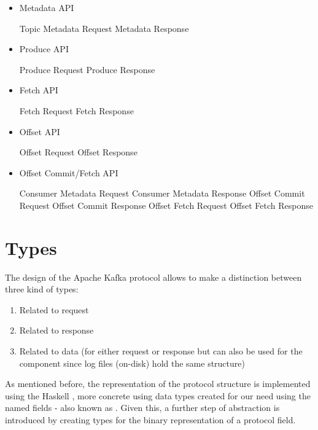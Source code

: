 \begin{itemize}
    \item Metadata API
    \begin{itemize}
        \tick Topic Metadata Request
        \fail Metadata Response
    \end{itemize}
    \item Produce API
    \begin{itemize}
        \tick Produce Request
        \tick Produce Response
    \end{itemize}
    \item Fetch API
    \begin{itemize}
        \tick Fetch Request
        \tick Fetch Response
    \end{itemize}
    \item Offset API
    \begin{itemize}
        \fail Offset Request
        \fail Offset Response
    \end{itemize}

    \item Offset Commit/Fetch API
    \begin{itemize}
        \fail Consumer Metadata Request
        \fail Consumer Metadata Response
        \fail Offset Commit Request
        \fail Offset Commit Response
        \fail Offset Fetch Request
        \fail Offset Fetch Response
    \end{itemize}
\end{itemize}

\section{Types}
The design of the Apache Kafka protocol allows to make a distinction between three kind of types:
\begin{enumerate}
  \item Related to request
  \item Related to response
  \item Related to data (for either request or response but can also be used for the  component since log files (on-disk) hold the same structure)
\end{enumerate}

As mentioned before, the representation of the protocol structure is implemented using the Haskell , more concrete using data types created
for our need using the named fields - also known as . Given this, a
further step of abstraction is introduced by creating types for the binary
representation of a protocol field. 

